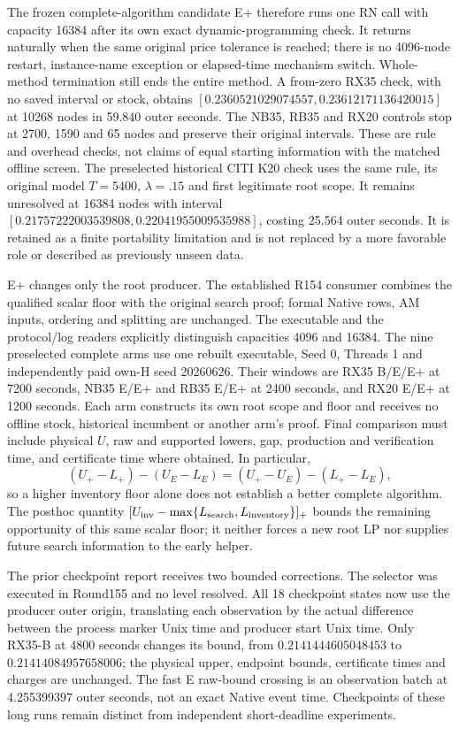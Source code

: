 The frozen complete-algorithm candidate E+ therefore runs one RN call
with capacity 16384 after its own exact dynamic-programming check. It
returns naturally when the same original price tolerance is reached;
there is no 4096-node restart, instance-name exception or elapsed-time
mechanism switch. Whole-method termination still ends the entire method.
A from-zero RX35 check, with no saved interval or stock, obtains
$[0.2360521029074557,0.23612171136420015]$ at 10268 nodes in 59.840 outer
seconds. The NB35, RB35 and RX20 controls stop at 2700, 1590 and 65 nodes
and preserve their original intervals. These are rule and overhead
checks, not claims of equal starting information with the matched offline
screen. The preselected historical CITI K20 check uses the same rule,
its original model $T=5400$, $\lambda=.15$ and first legitimate root scope.
It remains unresolved at 16384 nodes with interval
$[0.21757222003539808,0.22041955009535988]$, costing 25.564 outer seconds.
It is retained as a finite portability limitation and is not replaced by
a more favorable role or described as previously unseen data.

E+ changes only the root producer. The established R154 consumer combines
the qualified scalar floor with the original search proof; formal Native
rows, AM inputs, ordering and splitting are unchanged. The executable and
the protocol/log readers explicitly distinguish capacities 4096 and 16384.
The nine preselected complete arms use one rebuilt executable, Seed 0,
Threads 1 and independently paid own-H seed 20260626. Their windows are
RX35 B/E/E+ at 7200 seconds, NB35 E/E+ and RB35 E/E+ at 2400 seconds,
and RX20 E/E+ at 1200 seconds. Each arm constructs its own root scope and
floor and receives no offline stock, historical incumbent or another
arm's proof. Final comparison must include physical $U$, raw and supported
lowers, gap, production and verification time, and certificate time where
obtained. In particular,
\[
 (U_+-L_+)-(U_E-L_E)=(U_+-U_E)-(L_+-L_E),
\]
so a higher inventory floor alone does not establish a better complete
algorithm. The posthoc quantity
$[U_{\rm inv}-\max\{L_{\rm search},L_{\rm inventory}\}]_+$ bounds the
remaining opportunity of this same scalar floor; it neither forces a new
root LP nor supplies future search information to the early helper.

The prior checkpoint report receives two bounded corrections. The selector
was executed in Round155 and no level resolved. All 18 checkpoint states
now use the producer outer origin, translating each observation by the
actual difference between the process marker Unix time and producer
start Unix time. Only RX35-B at 4800 seconds changes its bound, from
$0.2141444605048453$ to$0.21414084957658006$; the physical upper, endpoint
bounds, certificate times and charges are unchanged. The fast E raw-bound
crossing is an observation batch at 4.255399397 outer seconds, not an exact
Native event time. Checkpoints of these long runs remain distinct from
independent short-deadline experiments.

